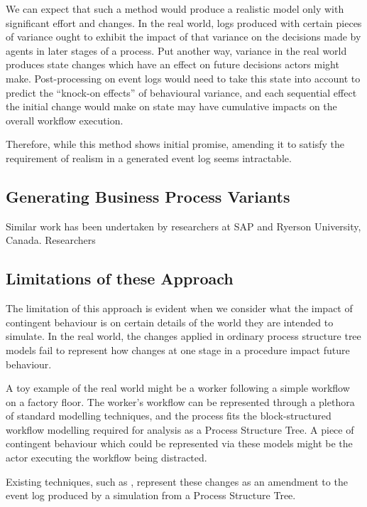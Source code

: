\documentclass[12pt,draft]{article}
\begin{document}
We can expect that such a method would produce a realistic model only with
significant effort and changes. In the real world, logs produced with certain
pieces of variance ought to exhibit the impact of that variance on the decisions
made by agents in later stages of a process. Put another way, variance in the
real world produces state changes which have an effect on future decisions
actors might make. Post-processing on event logs would need to take this state
into account to predict the ``knock-on effects'' of behavioural variance, and
each sequential effect the initial change would make on state may have
cumulative impacts on the overall workflow execution.
\par

Therefore, while this method shows initial promise, amending it to satisfy the
requirement of realism in a generated event log seems intractable.
\par

\subsection{Generating Business Process Variants}  %
Similar work has been undertaken by researchers at SAP and Ryerson University,
Canada. Researchers 

\subsection{Limitations of these Approach}
The limitation of this approach is evident when we consider what the impact of
contingent behaviour is on certain details of the world they are intended to
simulate. In the real world, the changes applied in ordinary process structure
tree models fail to represent how changes at one stage in a procedure impact
future behaviour.\par

A toy example of the real world might be a worker following a simple workflow on
a factory floor. The worker's workflow can be represented through a plethora of
standard modelling techniques, and the process fits the block-structured
workflow modelling required for analysis as a Process Structure Tree. A piece of
contingent behaviour which could be represented via these models might be the
actor executing the workflow being distracted.\par

Existing techniques, such as , represent these changes as an
amendment to the event log produced by a simulation from a Process Structure
Tree. \par
\end{document}

